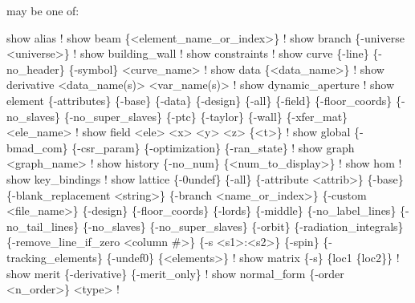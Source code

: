 {{{{ may be one of:
\begin{example}
  show alias                                                            ! 
  show beam \{<element_name_or_index>\}                                   ! 
  show branch \{-universe <universe>\}                                    ! 
  show building_wall                                                    ! 
  show constraints                                                      ! 
  show curve \{-line\} \{-no_header\} \{-symbol\} <curve_name>                ! 
  show data \{<data_name>\}                                               ! 
  show derivative <data_name(s)> <var_name(s)>                          ! 
  show dynamic_aperture                                                 ! 
  show element \{-attributes\} \{-base\} \{-data\} \{-design\} \{-all\} \{-field\} 
        \{-floor_coords\} \{-no_slaves\} \{-no_super_slaves\} \{-ptc\} \{-taylor\}
        \{-wall\} \{-xfer_mat\} <ele_name>                                  ! 
  show field <ele> <x> <y> <z> \{<t>\}                                    ! 
  show global \{-bmad_com\} \{-csr_param\} \{-optimization\} \{-ran_state\}     ! 
  show graph <graph_name>                                               ! 
  show history \{-no_num\} \{<num_to_display>\}                             ! 
  show hom                                                              ! 
  show key_bindings                                                     ! 
  show lattice \{-0undef\} \{-all\} \{-attribute <attrib>\} \{-base\} 
        \{-blank_replacement <string>\} \{-branch <name_or_index>\} 
        \{-custom <file_name>\} \{-design\} \{-floor_coords\} \{-lords\} \{-middle\} 
        \{-no_label_lines\} \{-no_tail_lines\} \{-no_slaves\} \{-no_super_slaves\} \{-orbit\} 
        \{-radiation_integrals\} \{-remove_line_if_zero <column \#>\} \{-s <s1>:<s2>\} 
        \{-spin\} \{-tracking_elements\} \{-undef0\} \{<elements>\}           ! 
  show matrix \{-s\} \{loc1 \{loc2\}\}                                      ! 
  show merit \{-derivative\} \{-merit_only\}                              ! 
  show normal_form \{-order <n_order>\} <type>                          ! 

\end{example}}}}}
